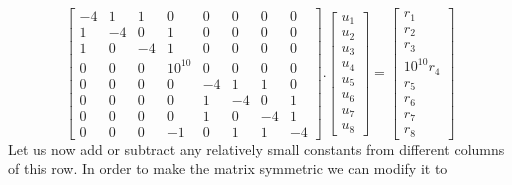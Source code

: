 \documentclass{article}
\numberwithin{equation}{section}
\begin{document}
\begin{equation}
\left[
\begin{array}{ccc|c|cccc}
-4 & 1 & 1 & 0 & 0 & 0 & 0 & 0 \\
1 & -4 & 0 & 1 & 0 & 0 & 0 & 0 \\
1 & 0 & -4 & 1 & 0 & 0 & 0 & 0 \\
\hline
0 & 0 & 0 & 10^{10} & 0 & 0 & 0 & 0 \\
\hline
0 & 0 & 0 & 0 & -4 & 1 & 1 & 0 \\
0 & 0 & 0 & 0 & 1 & -4 & 0 & 1 \\
0 & 0 & 0 & 0 & 1 & 0 & -4 & 1 \\
0 & 0 & 0 & -1 & 0 & 1 & 1 & -4
\end{array}
\right].
\left[
\begin{array}{c}
u_1\\
u_2\\
u_3\\
u_4\\
u_5\\
u_6\\
u_7\\
u_8
\end{array}
\right]
=\left[
\begin{array}{c}
r_1\\
r_2\\
r_3\\
10^{10}r_4\\
r_5\\
r_6\\
r_7\\
r_8
\end{array}
\right]
\end{equation}
Let us now add or subtract any relatively small constants from different columns of this row. In order to make the matrix symmetric we can modify it to
\end{document}
